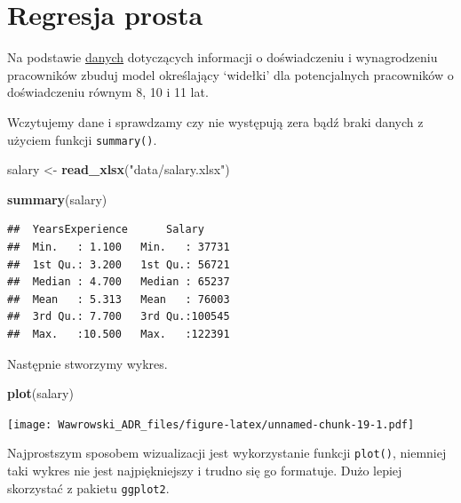 \documentclass[
]{book}
\newenvironment{Shaded}{\begin{snugshade}}{\end{snugshade}}
\newcommand{\KeywordTok}[1]{\textcolor[rgb]{0.13,0.29,0.53}{\textbf{#1}}}
\newcommand{\NormalTok}[1]{#1}
\newcommand{\StringTok}[1]{\textcolor[rgb]{0.31,0.60,0.02}{#1}}
\begin{document}
\hypertarget{regresja-prosta}{%
\section{Regresja prosta}\label{regresja-prosta}}

Na podstawie \href{data/salary.xlsx}{danych} dotyczących informacji o doświadczeniu i wynagrodzeniu pracowników zbuduj model określający `widełki' dla potencjalnych pracowników o doświadczeniu równym 8, 10 i 11 lat.

Wczytujemy dane i sprawdzamy czy nie występują zera bądź braki danych z użyciem funkcji \texttt{summary()}.

\begin{Shaded}
\begin{Highlighting}[]
\NormalTok{salary <-}\StringTok{ }\KeywordTok{read_xlsx}\NormalTok{(}\StringTok{"data/salary.xlsx"}\NormalTok{)}

\KeywordTok{summary}\NormalTok{(salary)}
\end{Highlighting}
\end{Shaded}

\begin{verbatim}
##  YearsExperience      Salary      
##  Min.   : 1.100   Min.   : 37731  
##  1st Qu.: 3.200   1st Qu.: 56721  
##  Median : 4.700   Median : 65237  
##  Mean   : 5.313   Mean   : 76003  
##  3rd Qu.: 7.700   3rd Qu.:100545  
##  Max.   :10.500   Max.   :122391
\end{verbatim}

Następnie stworzymy wykres.

\begin{Shaded}
\begin{Highlighting}[]
\KeywordTok{plot}\NormalTok{(salary)}
\end{Highlighting}
\end{Shaded}

\texttt{[image: Wawrowski\_ADR\_files/figure-latex/unnamed-chunk-19-1.pdf]}

Najprostszym sposobem wizualizacji jest wykorzystanie funkcji \texttt{plot()}, niemniej taki wykres nie jest najpiękniejszy i trudno się go formatuje. Dużo lepiej skorzystać z pakietu \texttt{ggplot2}.
\end{document}
